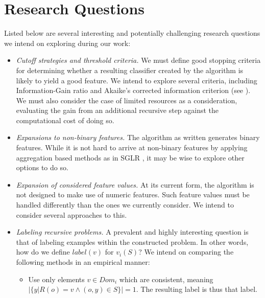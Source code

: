 \documentclass[12pt, a4paper]{article}
\theoremstyle{definition}
\begin{document}
\section{Research Questions}
Listed below are several interesting and potentially challenging research questions we intend on exploring during our work:
\begin{itemize}
    \item \emph{Cutoff strategies and threshold criteria.} We must define good stopping criteria for determining whether a resulting classifier created by the algorithm is likely to yield a good feature. We intend to explore several criteria, including Information-Gain ratio \citep{quinlan1986} and Akaike's corrected information criterion (see \citet{burnham2002model}). We must also consider the case of limited resources as a consideration, evaluating the gain from an additional recursive step against the computational cost of doing so. %
    \item \emph{Expansions to non-binary features.} The algorithm as written generates binary features. While it is not hard to arrive at non-binary features by applying aggregation based methods as in SGLR \citep{popescul200716}, it may be wise to explore other options to do so.
    \item \emph{Expansion of considered feature values.} At its current form, the algorithm is not designed to make use of numeric features. Such feature values must be handled differently than the ones we currently consider. We intend to consider several approaches to this.
    \item \emph{Labeling recursive problems.} A prevalent and highly interesting question is that of labeling examples within the constructed problem. In other words, how do we define $label(v)$ for $v_i(S)$? We intend on comparing the following methods in an empirical manner:
        \begin{itemize}
            \item Use only elements $v\in Dom_i$ which are consistent, meaning $|\{y|R(o)=v \wedge (o,y)\in S\}|=1$. The resulting label is thus that label.

\end{itemize}
\end{itemize}
\end{document}
